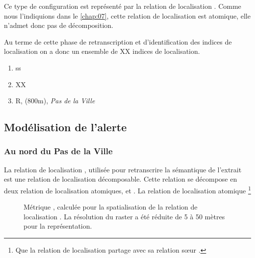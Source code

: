 Ce type de configuration est représenté par la relation de
localisation
. Comme nous
l'indiquions dans le \autoref{chap:07}, cette relation de localisation
est atomique, elle n'admet donc pas de décomposition.

%
Au terme de cette phase de retranscription et d'identification des
indices de localisation on a donc un ensemble de XX indices de
localisation.
%
\begin{enumerate}
\item ss
\item XX
\item R, (800m), \emph{Pas de la Ville}
\end{enumerate}


\subsection{Modélisation de l'alerte}
\label{subsec:9-2-2}




\subsubsection{Au nord du Pas de la Ville}

La relation de localisation ,
utilisée pour retranscrire la sémantique de l'extrait  est
une relation de localisation décomposable.
%
Cette relation se décompose en deux relation de localisation
atomiques,  et
. La relation de localisation
atomique  \footnote{Que la relation de
  localisation \protect{} partage avec
  sa relation sœur \protect{}.}


\begin{figure}
  \centering
  
  \caption{Métrique \protect{}, calculée
    pour la spatialisation de la relation de localisation
    \protect{}. La résolution du raster a
    été réduite de 5 à 50 mètres pour la représentation.}
  \label{fig:veyont_EcartNord}
\end{figure}


%   



